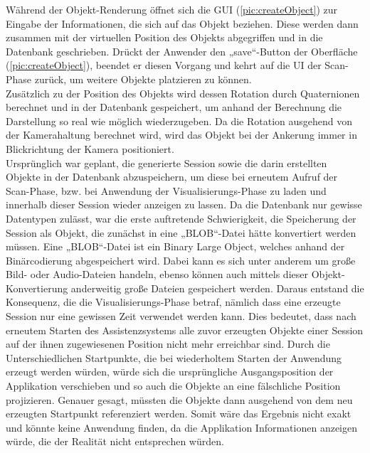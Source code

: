 Während der Objekt-Renderung öffnet sich die \acs{GUI} (\ref{pic:createObject}) zur Eingabe der Informationen, die sich auf das Objekt beziehen. Diese 
werden dann zusammen mit der virtuellen Position des Objekts abgegriffen und in die Datenbank geschrieben. Drückt der Anwender den „save“-Button der Oberfläche 
(\ref{pic:createObject}), beendet er diesen Vorgang und kehrt auf die \acs{UI} der Scan-Phase zurück, um weitere Objekte platzieren zu können. 
\\ 
Zusätzlich zu der Position des Objekts wird dessen Rotation durch Quaternionen berechnet und in der Datenbank gespeichert, um anhand der Berechnung 
die Darstellung so real wie möglich wiederzugeben. Da die Rotation ausgehend von der Kamerahaltung berechnet wird, wird das Objekt bei der Ankerung immer in 
Blickrichtung der Kamera positioniert.
\\ 
\linebreak
Ursprünglich war geplant, die generierte Session sowie die darin erstellten Objekte in der Datenbank abzuspeichern, um diese bei erneutem Aufruf der 
Scan-Phase, bzw. bei Anwendung der Visualisierungs-Phase zu laden und innerhalb dieser Session wieder anzeigen zu lassen. Da die Datenbank nur gewisse Datentypen 
zulässt, war die erste auftretende Schwierigkeit, die Speicherung der Session als Objekt, die zunächst in eine „BLOB“-Datei hätte konvertiert werden müssen. Eine 
„BLOB“-Datei ist ein Binary Large Object, welches anhand der Binärcodierung abgespeichert wird. Dabei kann es sich unter anderem um große 
Bild- oder Audio-Dateien handeln, ebenso können auch mittels dieser Objekt-Konvertierung anderweitig große Dateien gespeichert werden. Daraus entstand die 
Konsequenz, die die Visualisierungs-Phase betraf, nämlich dass eine erzeugte Session nur eine gewissen Zeit verwendet werden kann. Dies bedeutet, dass nach erneutem 
Starten des Assistenzsystems alle zuvor erzeugten Objekte einer Session auf der ihnen zugewiesenen Position nicht mehr erreichbar sind. Durch die Unterschiedlichen 
Startpunkte, die bei wiederholtem Starten der Anwendung erzeugt werden würden, würde sich die ursprüngliche Ausgangsposition der Applikation verschieben und so auch 
die Objekte an eine fälschliche Position projizieren. Genauer gesagt, müssten die Objekte dann ausgehend von dem neu erzeugten Startpunkt referenziert werden. Somit wäre das 
Ergebnis nicht exakt und könnte keine Anwendung finden, da die Applikation Informationen anzeigen würde, die der Realität nicht entsprechen würden. 
\\ 
